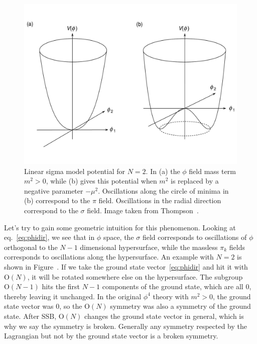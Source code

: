 \begin{figure}[t]
\centering
\includegraphics[width=0.8\linewidth]{figs/symm_break.pdf}
\caption{Linear sigma model potential for $N=2$. In (a) the $\phi$ field
         mass term $m^2>0$, while (b) gives this potential when
         $m^2$ is replaced by a negative parameter $-\mu^2$.
         Oscillations along the circle of minima in (b) correspond to 
         the $\pi$ field. Oscillations in the radial direction correspond
         to the $\sigma$ field. Image taken from 
         Thompson~\cite{thomson_modern_2013}.}
\label{fig:ssb}
\end{figure}

Let's try to gain some geometric intuition for this phenomenon. 
Looking at eq.~\eqref{eq:phidir}, we see that in $\phi$ space, the $\sigma$
field corresponds to oscillations of $\phi$ orthogonal to the $N-1$
dimensional hypersurface, while the massless $\pi_k$ fields
corresponds to oscillations along the hypersurface. 
An example with $N=2$ is shown in Figure~. 
If we take the ground state vector~\eqref{eq:phidir} and hit it with
$\text{O}(N)$, it will be rotated somewhere else on the hypersurface.
The subgroup $\text{O}(N-1)$ hits the first $N-1$ components of the
ground state, which are all 0, thereby leaving it unchanged.
In the original $\phi^4$ theory with
$m^2>0$, the ground state vector was 0, so the $\text{O}(N)$ symmetry
was also a symmetry of the ground state. After SSB, $\text{O}(N)$ changes 
the ground state vector in general,
which is why we say the symmetry is broken. Generally any symmetry
respected by the Lagrangian but not by the ground state vector
is a broken symmetry.

